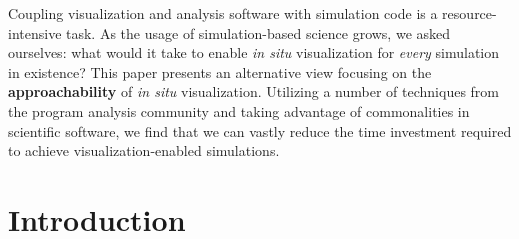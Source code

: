 \newcommand{\addr}[1]{\texttt{#1}}
\newcommand{\pointsto}[0]{\rightarrow}
\newcommand{\union}[0]{\cup}


%

Coupling visualization and analysis software with simulation code is a
resource-intensive task.  As the usage of simulation-based science
grows, we asked ourselves: what would it take to enable \textit{in
situ} visualization for \emph{every} simulation in existence?  This
paper presents an alternative view focusing on the
\textbf{approachability} of
\textit{in situ} visualization.  Utilizing a number of techniques from
the program analysis community and taking advantage of commonalities
in scientific software, we find that we can vastly reduce the time
investment required to achieve visualization-enabled simulations.


\section{Introduction}

